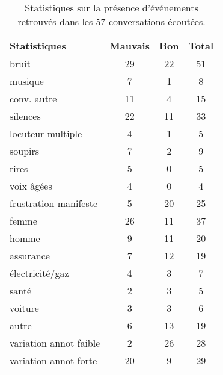 \begin{table}[h]
    \centering
    \begin{tabular}{|p{6cm}|c c c|}
         \hline
         Statistiques &Mauvais &Bon &Total \\
         \hline
         bruit &29 &22 &51 \\
         musique &7 &1 &8 \\
         conv. autre &11 &4 &15 \\
         silences &22 &11 &33 \\
         locuteur multiple &4 &1 &5 \\
         soupirs &7 &2 &9 \\
         rires &5 &0 &5 \\
         voix âgées &4 &0 &4 \\
         frustration manifeste &5 &20 &25 \\
         \hline
         femme &26 &11 &37 \\
         homme &9 &11 &20 \\
         \hline
         assurance &7 &12 &19 \\
         électricité/gaz &4 &3 &7 \\
         santé &2 &3 &5 \\
         voiture &3 &3 &6 \\
         autre &6 &13 &19 \\
         \hline
         variation annot faible &2 &26 &28 \\
         variation annot forte &20 &9 &29 \\
         \hline
    \end{tabular}
    \caption{Statistiques sur la présence d'événements retrouvés dans les 57 conversations écoutées.}
    \label{tab:ecouteHumaine}
\end{table}

